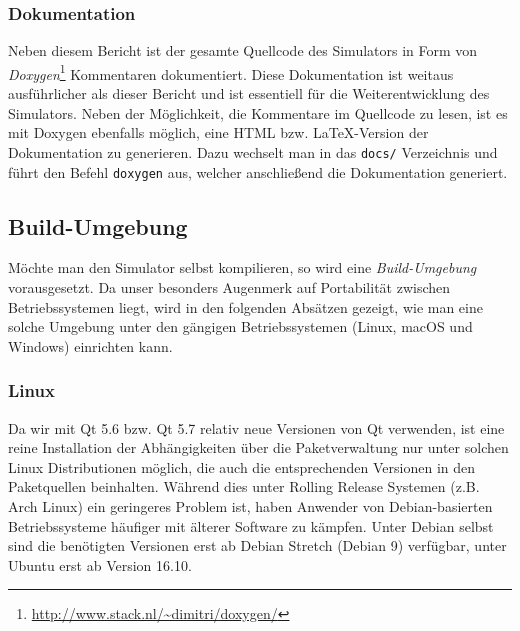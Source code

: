 \subsubsection{Dokumentation}

Neben diesem Bericht ist der gesamte Quellcode des Simulators in Form von
\emph{Doxygen}\footnote{\url{http://www.stack.nl/~dimitri/doxygen/}} Kommentaren
dokumentiert. Diese Dokumentation ist weitaus ausführlicher als dieser Bericht
und ist essentiell für die Weiterentwicklung des Simulators. Neben der
Möglichkeit, die Kommentare im Quellcode zu lesen, ist es mit Doxygen ebenfalls
möglich, eine HTML bzw. \LaTeX -Version der Dokumentation zu generieren. Dazu
wechselt man in das \texttt{docs/} Verzeichnis und führt den Befehl
\texttt{doxygen} aus, welcher anschließend die Dokumentation generiert.

\subsection{Build-Umgebung}

Möchte man den Simulator selbst kompilieren, so wird eine \emph{Build-Umgebung}
vorausgesetzt. Da unser besonders Augenmerk auf Portabilität zwischen
Betriebssystemen liegt, wird in den folgenden Absätzen gezeigt, wie man eine
solche Umgebung unter den gängigen Betriebssystemen (Linux, macOS und Windows)
einrichten kann.

\subsubsection{Linux}

Da wir mit Qt 5.6 bzw. Qt 5.7 relativ neue Versionen von Qt verwenden, ist eine
reine Installation der Abhängigkeiten über die Paketverwaltung nur unter solchen
Linux Distributionen möglich, die auch die entsprechenden Versionen in den
Paketquellen beinhalten. Während dies unter Rolling Release Systemen (z.B. Arch
Linux) ein geringeres Problem ist, haben Anwender von Debian-basierten
Betriebssysteme häufiger mit älterer Software zu kämpfen. Unter Debian selbst
sind die benötigten Versionen erst ab Debian Stretch (Debian 9) verfügbar, unter
Ubuntu erst ab Version 16.10.

